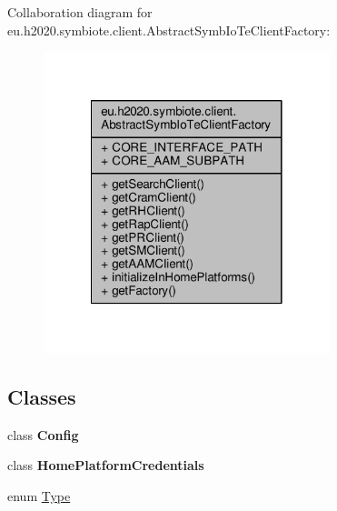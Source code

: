 Collaboration diagram for eu.\+h2020.\+symbiote.\+client.\+Abstract\+Symb\+Io\+Te\+Client\+Factory\+:
\nopagebreak
\begin{figure}[H]
\begin{center}
\leavevmode
\includegraphics[width=236pt]{classeu_1_1h2020_1_1symbiote_1_1client_1_1AbstractSymbIoTeClientFactory__coll__graph}
\end{center}
\end{figure}
\subsection*{Classes}
\begin{DoxyCompactItemize}
\item 
class {\bfseries Config}
\item 
class {\bfseries Home\+Platform\+Credentials}
\item 
enum \hyperlink{enumeu_1_1h2020_1_1symbiote_1_1client_1_1AbstractSymbIoTeClientFactory_1_1Type}{Type}
\end{DoxyCompactItemize}
